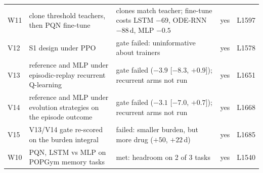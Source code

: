 \documentclass[10pt]{article}
\begin{document}
\begin{table}[h]
{\begin{tabular}{@{}lllll@{}}
W11 & clone threshold teachers, then PQN fine-tune & clones match teacher; fine-tune costs LSTM $-69$, ODE-RNN $-88$\,d, MLP $-0.5$ & yes & L1597 \\
V12 & S1 design under PPO & gate failed: uninformative about trainers & yes & L1578 \\
V13 & reference and MLP under episodic-replay recurrent Q-learning & gate failed ($-3.9$ [$-8.3$, $+0.9$]); recurrent arms not run & yes & L1651 \\
V14 & reference and MLP under evolution strategies on the episode outcome & gate failed ($-3.1$ [$-7.0$, $+0.7$]); recurrent arms not run & yes & L1668 \\
V15 & V13/V14 gate re-scored on the burden integral & failed: smaller burden, but more drug ($+50$, $+22$\,d) & yes & L1685 \\
W10 & PQN, LSTM vs MLP on POPGym memory tasks & met: headroom on 2 of 3 tasks & yes & L1540 \\
\bottomrule
\end{tabular}}
\end{table}
\end{document}
